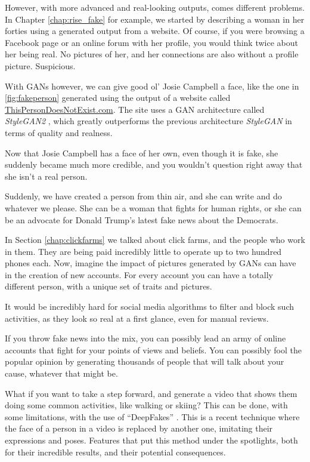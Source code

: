 However, with more advanced and real-looking outputs, comes different problems. In Chapter \ref{chap:rise_fake} for example, we started by describing a woman in her forties using a generated output from a website. Of course, if you were browsing a Facebook page or an online forum with her profile, you would think twice about her being real. No pictures of her, and her connections are also without a profile picture. Suspicious.

With GANs however, we can give good ol' Josie Campbell a face, like the one in \ref{fig:fakeperson} generated using the output of a website called \href{https://thispersondoesnotexist.com}{ThisPersonDoesNotExist.com}. The site uses a GAN architecture called \textit{StyleGAN2} \cite{karras2020analyzing}, which greatly outperforms the previous architecture \textit{StyleGAN} \cite{karras2019stylebased} in terms of quality and realness.

Now that Josie Campbell has a face of her own, even though it is fake, she suddenly became much more credible, and you wouldn't question right away that she isn't a real person.

Suddenly, we have created a person from thin air, and she can write and do whatever we please. She can be a woman that fights for human rights, or she can be an advocate for Donald Trump's latest fake news about the Democrats.

In Section \ref{chap:clickfarms} we talked about click farms, and the people who work in them. They are being paid incredibly little to operate up to two hundred phones each. Now, imagine the impact of pictures generated by GANs can have in the creation of new accounts. For every account you can have a totally different person, with a unique set of traits and pictures.

It would be incredibly hard for social media algorithms to filter and block such activities, as they look so real at a first glance, even for manual reviews.

If you throw fake news into the mix, you can possibly lead an army of online accounts that fight for your points of views and beliefs. You can possibly fool the popular opinion by generating thousands of people that will talk about your cause, whatever that might be. 

What if you want to take a step forward, and generate a video that shows them doing some common activities, like walking or skiing? This can be done, with some limitations, with the use of ``DeepFakes'' \cite{Suwajanakorn2017SynthesizingO, thies2020face2face}. This is a recent technique where the face of a person in a video is replaced by another one, imitating their expressions and poses. Features that put this method under the spotlights, both for their incredible results, and their potential consequences.

